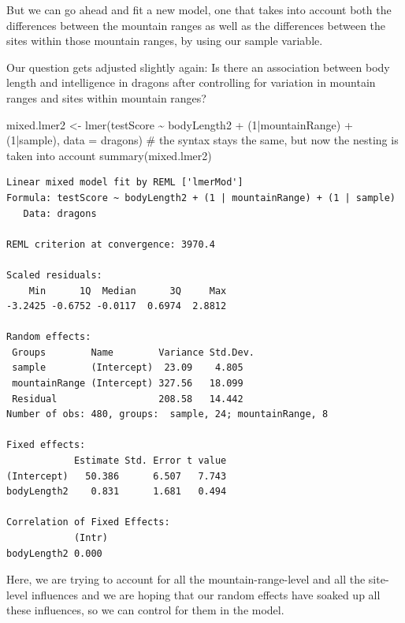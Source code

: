 \documentclass[
  letterpaper,
  DIV=11,
  numbers=noendperiod]{scrreprt}
\newenvironment{Shaded}{\begin{snugshade}}{\end{snugshade}}
\newcommand{\AttributeTok}[1]{\textcolor[rgb]{0.40,0.45,0.13}{#1}}
\newcommand{\CommentTok}[1]{\textcolor[rgb]{0.37,0.37,0.37}{#1}}
\newcommand{\DecValTok}[1]{\textcolor[rgb]{0.68,0.00,0.00}{#1}}
\newcommand{\FunctionTok}[1]{\textcolor[rgb]{0.28,0.35,0.67}{#1}}
\newcommand{\NormalTok}[1]{\textcolor[rgb]{0.00,0.23,0.31}{#1}}
\newcommand{\OtherTok}[1]{\textcolor[rgb]{0.00,0.23,0.31}{#1}}
\newcommand{\SpecialCharTok}[1]{\textcolor[rgb]{0.37,0.37,0.37}{#1}}
\begin{document}
But we can go ahead and fit a new model, one that takes into account
both the differences between the mountain ranges as well as the
differences between the sites within those mountain ranges, by using our
sample variable.

Our question gets adjusted slightly again: Is there an association
between body length and intelligence in dragons after controlling for
variation in mountain ranges and sites within mountain ranges?

\begin{Shaded}
\begin{Highlighting}[]
\NormalTok{mixed.lmer2 }\OtherTok{\textless{}{-}} \FunctionTok{lmer}\NormalTok{(testScore }\SpecialCharTok{\textasciitilde{}}\NormalTok{ bodyLength2 }\SpecialCharTok{+}\NormalTok{ (}\DecValTok{1}\SpecialCharTok{|}\NormalTok{mountainRange) }\SpecialCharTok{+}\NormalTok{ (}\DecValTok{1}\SpecialCharTok{|}\NormalTok{sample), }\AttributeTok{data =}\NormalTok{ dragons)  }\CommentTok{\# the syntax stays the same, but now the nesting is taken into account}
\FunctionTok{summary}\NormalTok{(mixed.lmer2)}
\end{Highlighting}
\end{Shaded}

\begin{verbatim}
Linear mixed model fit by REML ['lmerMod']
Formula: testScore ~ bodyLength2 + (1 | mountainRange) + (1 | sample)
   Data: dragons

REML criterion at convergence: 3970.4

Scaled residuals: 
    Min      1Q  Median      3Q     Max 
-3.2425 -0.6752 -0.0117  0.6974  2.8812 

Random effects:
 Groups        Name        Variance Std.Dev.
 sample        (Intercept)  23.09    4.805  
 mountainRange (Intercept) 327.56   18.099  
 Residual                  208.58   14.442  
Number of obs: 480, groups:  sample, 24; mountainRange, 8

Fixed effects:
            Estimate Std. Error t value
(Intercept)   50.386      6.507   7.743
bodyLength2    0.831      1.681   0.494

Correlation of Fixed Effects:
            (Intr)
bodyLength2 0.000 
\end{verbatim}

Here, we are trying to account for all the mountain-range-level and all
the site-level influences and we are hoping that our random effects have
soaked up all these influences, so we can control for them in the model.
\end{document}
